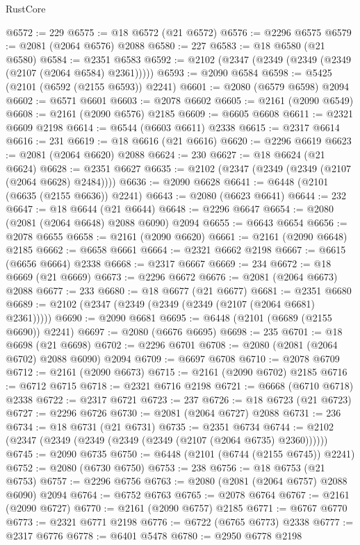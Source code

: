 \begin{lexlean}{RustCore}
\begin{coremodule}
@6572 := 229
@6575 := @18 @6572 (@21 @6572)
@6576 := @2296 @6575
@6579 := @2081 (@2064 @6576) @2088
@6580 := 227
@6583 := @18 @6580 (@21 @6580)
@6584 := @2351 @6583
@6592 := @2102 (@2347 (@2349 (@2349 (@2349 (@2107 (@2064 @6584) @2361)))))
@6593 := @2090 @6584
@6598 := @5425 (@2101 (@6592 (@2155 @6593)) @2241)
@6601 := @2080 (@6579 @6598) @2094
@6602 := @6571 @6601
@6603 := @2078 @6602
@6605 := @2161 (@2090 @6549)
@6608 := @2161 (@2090 @6576) @2185
@6609 := @6605 @6608
@6611 := @2321 @6609 @2198
@6614 := @6544 (@6603 @6611) @2338
@6615 := @2317 @6614
@6616 := 231
@6619 := @18 @6616 (@21 @6616)
@6620 := @2296 @6619
@6623 := @2081 (@2064 @6620) @2088
@6624 := 230
@6627 := @18 @6624 (@21 @6624)
@6628 := @2351 @6627
@6635 := @2102 (@2347 (@2349 (@2349 (@2107 (@2064 @6628) @2484))))
@6636 := @2090 @6628
@6641 := @6448 (@2101 (@6635 (@2155 @6636)) @2241)
@6643 := @2080 (@6623 @6641)
@6644 := 232
@6647 := @18 @6644 (@21 @6644)
@6648 := @2296 @6647
@6654 := @2080 (@2081 (@2064 @6648) @2088 @6090) @2094
@6655 := @6643 @6654
@6656 := @2078 @6655
@6658 := @2161 (@2090 @6620)
@6661 := @2161 (@2090 @6648) @2185
@6662 := @6658 @6661
@6664 := @2321 @6662 @2198
@6667 := @6615 (@6656 @6664) @2338
@6668 := @2317 @6667
@6669 := 234
@6672 := @18 @6669 (@21 @6669)
@6673 := @2296 @6672
@6676 := @2081 (@2064 @6673) @2088
@6677 := 233
@6680 := @18 @6677 (@21 @6677)
@6681 := @2351 @6680
@6689 := @2102 (@2347 (@2349 (@2349 (@2349 (@2107 (@2064 @6681) @2361)))))
@6690 := @2090 @6681
@6695 := @6448 (@2101 (@6689 (@2155 @6690)) @2241)
@6697 := @2080 (@6676 @6695)
@6698 := 235
@6701 := @18 @6698 (@21 @6698)
@6702 := @2296 @6701
@6708 := @2080 (@2081 (@2064 @6702) @2088 @6090) @2094
@6709 := @6697 @6708
@6710 := @2078 @6709
@6712 := @2161 (@2090 @6673)
@6715 := @2161 (@2090 @6702) @2185
@6716 := @6712 @6715
@6718 := @2321 @6716 @2198
@6721 := @6668 (@6710 @6718) @2338
@6722 := @2317 @6721
@6723 := 237
@6726 := @18 @6723 (@21 @6723)
@6727 := @2296 @6726
@6730 := @2081 (@2064 @6727) @2088
@6731 := 236
@6734 := @18 @6731 (@21 @6731)
@6735 := @2351 @6734
@6744 := @2102 (@2347 (@2349 (@2349 (@2349 (@2349 (@2107 (@2064 @6735) @2360))))))
@6745 := @2090 @6735
@6750 := @6448 (@2101 (@6744 (@2155 @6745)) @2241)
@6752 := @2080 (@6730 @6750)
@6753 := 238
@6756 := @18 @6753 (@21 @6753)
@6757 := @2296 @6756
@6763 := @2080 (@2081 (@2064 @6757) @2088 @6090) @2094
@6764 := @6752 @6763
@6765 := @2078 @6764
@6767 := @2161 (@2090 @6727)
@6770 := @2161 (@2090 @6757) @2185
@6771 := @6767 @6770
@6773 := @2321 @6771 @2198
@6776 := @6722 (@6765 @6773) @2338
@6777 := @2317 @6776
@6778 := @6401 @5478
@6780 := @2950 @6778 @2198

\end{coremodule}
\end{lexlean}
